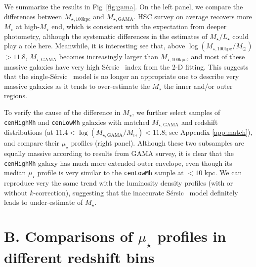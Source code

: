 \documentclass[a4paper,fleqn,usenatbib]{mnras}
\def\ser{{S\'{e}rsic\ }}
\def\rbcg{\texttt{cenHighMh}}
\def\nbcg{\texttt{cenLowMh}}
\def\mstar{{$M_{\star}$}}
\def\mtot{{$M_{\star,100\mathrm{kpc}}$}}
\def\mgama{{$M_{\star,\mathrm{GAMA}}$}}
\def\logmtot{{$\log (M_{\star,100\mathrm{kpc}}/M_{\odot})$}}
\def\logmgama{{$\log (M_{\star,\mathrm{GAMA}}/M_{\odot})$}}
\def\m2l{{$M_{\star}/L_{\star}$}}
\def\mden{{$\mu_{\star}$}}
\begin{document}
    We summarize the results in Fig~\ref{fig:gama}.  
    On the left panel, we compare the differences between \mtot{} and \mgama{}. 
    HSC survey on average recovers more \mstar{} at high-\mstar{} end, which is 
    consistent with the expectation from deeper photometry, although the 
    systematic differences in the estimates of \m2l{} could play a role here. 
    Meanwhile, it is interesting see that, above \logmtot{}$> 11.8$, \mgama{} 
    becomes increasingly larger than \mtot{}, and most of these massive 
    galaxies have very high \ser{} index from the 2-D fitting. 
    This suggests that the single-\ser{} model is no longer an appropriate one to 
    describe very massive galaxies as it tends to over-estimate the \mstar{} the 
    inner and/or outer regions. 
    
    To verify the cause of the difference in \mstar{}, we further select samples 
    of \rbcg{} and \nbcg{} galaxies with matched \mgama{} and redshift 
    distributions (at $11.4 <$\logmgama{}$<11.8$; see Appendix \ref{app:match}), 
    and compare their \mden{} profiles (right panel). 
    Although these two subsamples are equally massive according to results from 
    GAMA survey, it is clear that the \rbcg{} galaxy has much more extended 
    outer envelope, even though its median \mden{} profile is very similar 
    to the \nbcg{} sample at $< 10$ kpc. 
    We can reproduce very the same trend with the luminosity density profiles 
    (with or without $k$-correction), suggesting that the inaccurate \ser{} 
    model definitely leads to under-estimate of \mstar{}.  
 

\section{B. Comparisons of \mden{} profiles in different redshift bins}
    \label{app:redshift}
\end{document}
